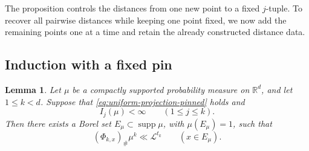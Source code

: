 \documentclass[11pt]{article}
\newtheorem{lemma}[theorem]{Lemma}
\theoremstyle{remark}
\newcommand{\R}{\mathbb R}
\newcommand{\cL}{\mathcal L}
\newcommand{\supp}{\operatorname{supp}}
\numberwithin{equation}{section}
\newcommand{\1}{\mathbf 1}
\begin{document}
The proposition controls the distances from one new point to a fixed
\(j\)-tuple.  To recover all pairwise distances while keeping one point
fixed, we now add the remaining points one at a time and retain the
already constructed distance data.

\subsection{Induction with a fixed pin}


\begin{lemma}
\label{lem:pinned-star-induction}
Let \(\mu\) be a compactly supported probability measure on \(\R^d\),
and let \(1\leq k<d\).  Suppose that
\eqref{eq:uniform-projection-pinned} holds and
\[
I_j(\mu)<\infty
\qquad
(1\leq j\leq k).
\]
Then there exists a Borel set
\(E_\mu\subset\supp\mu\), with \(\mu(E_\mu)=1\), such that
\[
(\Phi_{k,x})_\#\mu^k
\ll
\cL^{t_k}
\qquad (x\in E_\mu).
\]
\end{lemma}
\end{document}
